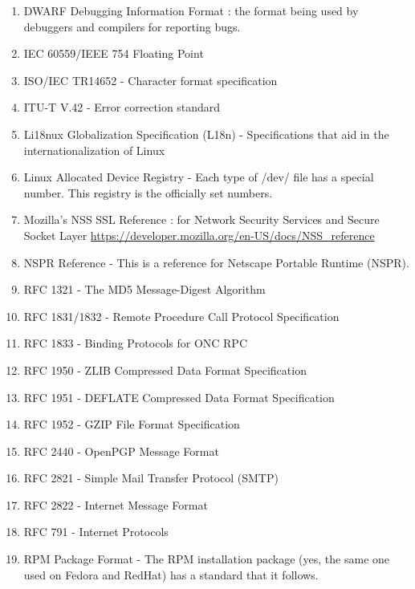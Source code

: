 \begin{enumerate}
  \item DWARF Debugging Information Format : the format being used by debuggers
  and compilers for reporting bugs.
  
  \item IEC 60559/IEEE 754 Floating Point
  
  \item ISO/IEC TR14652 - Character format specification
  
  \item ITU-T V.42 - Error correction standard
  
  \item Li18nux Globalization Specification (L18n) - Specifications that aid in
  the internationalization of Linux
  
  \item Linux Allocated Device Registry - Each type of /dev/ file has a special
  number. This registry is the officially set numbers.
  
  \item Mozilla's NSS SSL Reference : for Network Security Services and Secure
  Socket Layer \url{https://developer.mozilla.org/en-US/docs/NSS_reference}
  
  \item NSPR Reference - This is a reference for Netscape Portable Runtime (NSPR).

  \item RFC 1321 - The MD5 Message-Digest Algorithm

  \item RFC 1831/1832 - Remote Procedure Call Protocol Specification

  \item RFC 1833 - Binding Protocols for ONC RPC

  \item RFC 1950 - ZLIB Compressed Data Format Specification

  \item RFC 1951 - DEFLATE Compressed Data Format Specification

  \item RFC 1952 - GZIP File Format Specification

  \item RFC 2440 - OpenPGP Message Format

  \item RFC 2821 - Simple Mail Transfer Protocol (SMTP)

  \item RFC 2822 - Internet Message Format

  \item RFC 791 - Internet Protocols

  \item RPM Package Format - The RPM installation package (yes, the same one
used on Fedora and RedHat) has a standard that it follows.
\end{enumerate}

